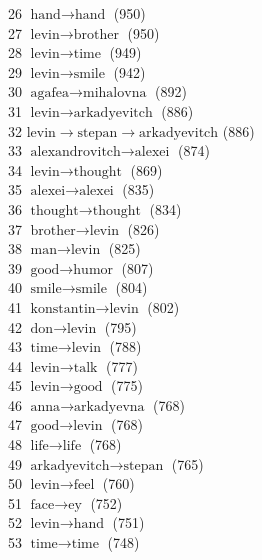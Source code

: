 \begin{appendices}
    26  $ \text{hand} \to \text{hand} $ (950) \\
    27  $ \text{levin} \to \text{brother} $ (950) \\
    28  $ \text{levin} \to \text{time} $ (949) \\
    29  $ \text{levin} \to \text{smile} $ (942) \\
    30  $ \text{agafea} \to \text{mihalovna} $ (892) \\
    31  $ \text{levin} \to \text{arkadyevitch} $ (886) \\
    32  $ \text{levin} \to \text{stepan} \to \text{arkadyevitch} $ (886) \\
    33  $ \text{alexandrovitch} \to \text{alexei} $ (874) \\
    34  $ \text{levin} \to \text{thought} $ (869) \\
    35  $ \text{alexei} \to \text{alexei} $ (835) \\
    36  $ \text{thought} \to \text{thought} $ (834) \\
    37  $ \text{brother} \to \text{levin} $ (826) \\
    38  $ \text{man} \to \text{levin} $ (825) \\
    39  $ \text{good} \to \text{humor} $ (807) \\
    40  $ \text{smile} \to \text{smile} $ (804) \\
    41  $ \text{konstantin} \to \text{levin} $ (802) \\
    42  $ \text{don} \to \text{levin} $ (795) \\
    43  $ \text{time} \to \text{levin} $ (788) \\
    44  $ \text{levin} \to \text{talk} $ (777) \\
    45  $ \text{levin} \to \text{good} $ (775) \\
    46  $ \text{anna} \to \text{arkadyevna} $ (768) \\
    47  $ \text{good} \to \text{levin} $ (768) \\
    48  $ \text{life} \to \text{life} $ (768) \\
    49  $ \text{arkadyevitch} \to \text{stepan} $ (765) \\
    50  $ \text{levin} \to \text{feel} $ (760) \\
    51  $ \text{face} \to \text{ey} $ (752) \\
    52  $ \text{levin} \to \text{hand} $ (751) \\
    53  $ \text{time} \to \text{time} $ (748) \\

\end{appendices}
